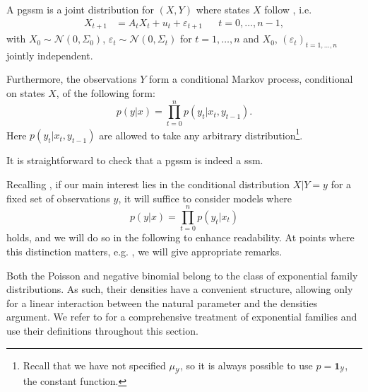 \begin{definition}
    A \acrfull{pgssm} is a joint distribution for $(X,Y)$ where states $X$ follow , i.e. 
    \begin{align*}
        X_{t + 1}  &= A_{t}X_{t} + u_{t} + \varepsilon_{t + 1} &  & t = 0, \dots, n - 1,
    \end{align*}
    with $X_{0} \sim \mathcal N(0, \Sigma_{0})$, $\varepsilon_{t} \sim \mathcal N (0, \Sigma_{t})$ for $t = 1, \dots, n$ and $X_{0}$, $(\varepsilon_{t})_{t = 1, \dots, n}$ jointly independent. 

    Furthermore, the observations $Y$ form a conditional Markov process, conditional on states $X$, of the following form:
    $$
    p(y | x) = \prod_{t = 0}^n p(y_{t} | x_{t}, y_{t - 1}).
    $$
    Here $p(y_{t} | x_{t}, y_{t -1})$ are allowed to take any arbitrary distribution\footnote{Recall that we have not specified $\mu_{\mathcal Y}$, so it is always possible to use $p = \mathbf 1 _{\mathcal Y}$, the constant function.}.
\end{definition}

It is straightforward to check that a \acrshort{pgssm} is indeed a \acrshort{ssm}. 

\begin{remark}
    Recalling , if our main interest lies in the conditional distribution $X|Y = y$ for a fixed set of observations $y$, it will suffice to consider models where 
    $$
    p(y | x) = \prod_{t = 0}^n p(y_{t} | x_{t})
    $$
    holds, and we will do so in the following to enhance readability. At points where this distinction matters, e.g. , we will give appropriate remarks.
\end{remark}

Both the Poisson and negative binomial belong to the class of exponential family distributions. As such, their densities have a convenient structure, allowing only for a linear interaction between the natural parameter and the densities argument. We refer to \citep{Brown1986Fundamentals} for a comprehensive treatment of exponential families and use their definitions throughout this section.

